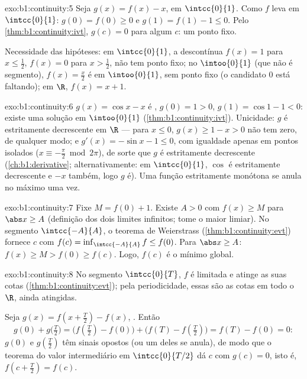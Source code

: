 \begin{solution}{exo:b1:continuity:5}
Seja $g(x) = f(x) - x$,  em $\intcc{0}{1}$. Como $f$ leva
em $\intcc{0}{1}$: $g(0) = f(0) \geq 0$ e $g(1) = f(1) - 1 \leq
0$. Pelo \cref{thm:b1:continuity:ivt}, $g(c) = 0$ para algum $c$: um
ponto fixo.

Necessidade das hipóteses: em $\intcc{0}{1}$, a  descontínua
$f(x) = 1$ para $x \leq \frac12$, $f(x) = 0$ para $x > \frac12$, não tem
ponto fixo; no  $\intoo{0}{1}$ (que não é segmento), $f(x) =
\frac x2$ é  em $\intoo{0}{1}$, sem ponto fixo
(o candidato $0$ está faltando); em $\R$, $f(x) = x + 1$.
\end{solution}

\begin{solution}{exo:b1:continuity:6}
$g(x) = \cos x - x$ é , $g(0) = 1 > 0$, $g(1) = \cos 1 -
1 < 0$: existe uma solução em $\intoo{0}{1}$
(\cref{thm:b1:continuity:ivt}). Unicidade: $g$ é estritamente
decrescente em $\R$ --- para $x \leq 0$, $g(x) \geq 1 - x > 0$ não tem
zero, de qualquer modo; e $g'(x) = -\sin x - 1 \leq 0$, com igualdade apenas em
pontos isolados ($x \equiv -\frac\pi2 \bmod 2\pi$), de sorte que $g$ é
estritamente decrescente (\cref{ch:b1:derivative}; alternativamente: em
$\intcc{0}{1}$, $\cos$ é estritamente decrescente e $-x$ também, logo $g$
é). Uma função estritamente monótona se anula no máximo uma vez.
\end{solution}

\begin{solution}{exo:b1:continuity:7}
Fixe $M = f(0) + 1$. Existe $A > 0$ com $f(x) \geq M$ para $\abs x
\geq A$ (definição dos dois limites infinitos; tome o maior
limiar). No segmento $\intcc{-A}{A}$, o teorema de Weierstrass
(\cref{thm:b1:continuity:evt}) fornece $c$ com $f(c) =
\inf_{\intcc{-A}{A}} f \leq f(0)$. Para $\abs x \geq A$: $f(x) \geq M
> f(0) \geq f(c)$. Logo, $f(c)$ é o mínimo global.
\end{solution}

\begin{solution}{exo:b1:continuity:8}
No segmento $\intcc{0}{T}$, $f$ é limitada e atinge as suas cotas
(\cref{thm:b1:continuity:evt}); pela periodicidade, essas são as cotas
em todo o $\R$, ainda atingidas.

Seja $g(x) = f(x + \frac T2) - f(x)$, . Então
\[
g(0) + g\bigl(\tfrac T2\bigr)
= \bigl(f(\tfrac T2) - f(0)\bigr) + \bigl(f(T) - f(\tfrac T2)\bigr)
= f(T) - f(0) = 0 :
\]
$g(0)$ e $g(\frac T2)$ têm sinais opostos (ou um deles se anula), de modo
que o teorema do valor intermediário em $\intcc{0}{T/2}$ dá $c$ com
$g(c) = 0$, isto é, $f(c + \frac T2) = f(c)$.
\end{solution}

